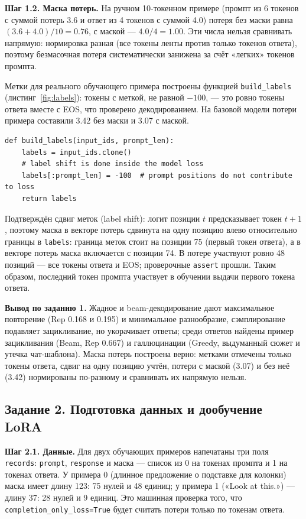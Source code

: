 \documentclass[14pt,a4paper]{extarticle}
\begin{document}
\textbf{Шаг 1.2. Маска потерь.} На ручном 10-токенном примере (промпт из 6 токенов
с суммой потерь 3.6 и ответ из 4 токенов с суммой 4.0) потеря без маски равна
$(3.6 + 4.0)/10 = 0.76$, с маской --- $4.0/4 = 1.00$. Эти числа нельзя сравнивать
напрямую: нормировка разная (все токены ленты против только токенов ответа), поэтому
безмасочная потеря систематически занижена за счёт «легких» токенов промпта.

Метки для реального обучающего примера построены функцией \texttt{build\_labels}
(листинг~\ref{fig:labels}): токены с меткой, не равной $-100$, --- это ровно токены
ответа вместе с EOS, что проверено декодированием. На базовой модели потери примера
составили 3.42 без маски и 3.07 с маской.

\begin{lstlisting}
def build_labels(input_ids, prompt_len):
    labels = input_ids.clone()
    # label shift is done inside the model loss
    labels[:prompt_len] = -100  # prompt positions do not contribute to loss
    return labels
\end{lstlisting}
\label{fig:labels}

Подтверждён сдвиг меток (label shift): логит позиции $t$ предсказывает токен $t+1$,
поэтому маска в векторе потерь сдвинута на одну позицию влево относительно границы
в \texttt{labels}: граница меток стоит на позиции 75 (первый токен ответа), а в
векторе потерь маска включается с позиции 74. В потере участвуют ровно 48 позиций ---
все токены ответа и EOS; проверочные \texttt{assert} прошли. Таким образом, последний
токен промпта участвует в обучении выдачи первого токена ответа.

\textbf{Вывод по заданию 1.} Жадное и beam-декодирование дают максимальное повторение
(Rep 0.168 и 0.195) и минимальное разнообразие, сэмплирование подавляет зацикливание,
но укорачивает ответы; среди ответов найдены пример зацикливания (Beam, Rep 0.667)
и галлюцинации (Greedy, выдуманный сюжет и утечка чат-шаблона). Маска потерь построена
верно: метками отмечены только токены ответа, сдвиг на одну позицию учтён, потери
с маской (3.07) и без неё (3.42) нормированы по-разному и сравнивать их напрямую нельзя.

\subsection{Задание 2. Подготовка данных и дообучение LoRA}

\textbf{Шаг 2.1. Данные.} Для двух обучающих примеров напечатаны три поля \texttt{records}:
\texttt{prompt}, \texttt{response} и маска --- список из 0 на токенах промпта и 1 на
токенах ответа. У примера 0 (длинное предложение о подставке для колонки) маска имеет
длину 123: 75 нулей и 48 единиц; у примера 1 («Look at this.») --- длину 37: 28 нулей
и 9 единиц. Это машинная проверка того, что \texttt{completion\_only\_loss=True} будет
считать потери только по токенам ответа.
\end{document}
